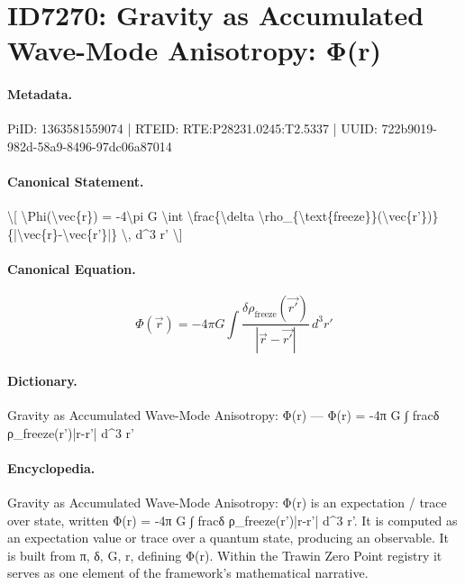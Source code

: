 \section*{ID7270: Gravity as Accumulated Wave-Mode Anisotropy: Φ(r)}
\paragraph{Metadata.}
PiID: 1363581559074 | RTEID: RTE:P28231.0245:T2.5337 | UUID: 722b9019-982d-58a9-8496-97dc06a87014

\paragraph{Canonical Statement.}
\textbackslash{}[ \textbackslash{}Phi(\textbackslash{}vec\{r\}) = -4\textbackslash{}pi G \textbackslash{}int \textbackslash{}frac\{\textbackslash{}delta \textbackslash{}rho\_\{\textbackslash{}text\{freeze\}\}(\textbackslash{}vec\{r'\})\}\{|\textbackslash{}vec\{r\}-\textbackslash{}vec\{r'\}|\} \textbackslash{}, d\textasciicircum{}3 r' \textbackslash{}]

\paragraph{Canonical Equation.}
\[
\Phi(\vec{r}) = -4\pi G \int \frac{\delta \rho_{\text{freeze}}(\vec{r'})}{|\vec{r}-\vec{r'}|} \, d^3 r'
\]

\paragraph{Dictionary.}
Gravity as Accumulated Wave-Mode Anisotropy: Φ(r) — Φ(r) = -4π G ∫ fracδ ρ\_freeze(r')|r-r'| d\textasciicircum{}3 r'

\paragraph{Encyclopedia.}
Gravity as Accumulated Wave-Mode Anisotropy: Φ(r) is an expectation / trace over state, written Φ(r) = -4π G ∫ fracδ ρ\_freeze(r')|r-r'| d\textasciicircum{}3 r'. It is computed as an expectation value or trace over a quantum state, producing an observable. It is built from π, δ, G, r, defining Φ(r). Within the Trawin Zero Point registry it serves as one element of the framework's mathematical narrative.
